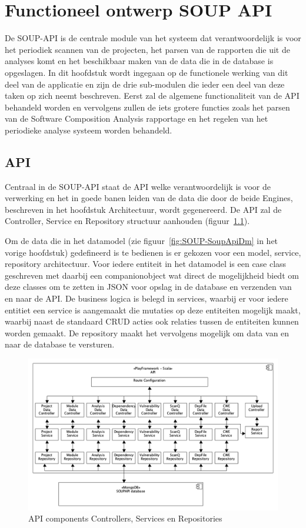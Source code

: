 
\chapter{Functioneel ontwerp SOUP API}\label{ch:impl soup api}
De SOUP-API is de centrale module van het systeem dat verantwoordelijk is voor het periodiek scannen van de projecten, het parsen van de rapporten die uit de analyses komt en het beschikbaar maken van de data die in de database is opgeslagen. In dit hoofdstuk wordt  ingegaan op de functionele werking van dit deel van de applicatie en zijn de drie sub-modulen die ieder een deel van deze taken op zich neemt beschreven. Eerst zal de algemene functionaliteit van de API behandeld worden en vervolgens zullen de iets grotere functies zoals het parsen van de Software Composition Analysis rapportage en het regelen van het periodieke analyse systeem worden behandeld.


\section{API}\label{sec:api2}
Centraal in de SOUP-API staat de API welke verantwoordelijk is voor de verwerking en het in goede banen leiden van de data die door de beide Engines, beschreven in het hoofdstuk Architectuur, wordt gegenereerd. De API zal de Controller, Service en Repository structuur aanhouden (figuur~\ref{fig:API components}).

Om de data die in het datamodel (zie figuur~\ref{fig:SOUP-SoupApiDm} in het vorige hoofdstuk) gedefineerd is te bedienen is er gekozen voor een model, service, repository architectuur. Voor iedere entiteit in het datamodel is een case class geschreven met daarbij een companionobject wat direct de mogelijkheid biedt om deze classes om te zetten in JSON voor opslag in de database en verzenden van en naar de API. De business logica is belegd in services, waarbij er voor iedere entitiet een service is aangemaakt die mutaties op deze entiteiten mogelijk maakt, waarbij naast de standaard CRUD acties ook relaties tussen de entiteiten kunnen worden gemaakt. De repository maakt het vervolgens mogelijk om data van en naar de database te versturen.

\begin{figure}[bth]
    \myfloatalign
    \includegraphics[width=12cm]{gfx/umlet/exports/API-ComponentsDiagram}
    \caption{API components Controllers, Services en Repositories}
    \label{fig:API components}
\end{figure}


